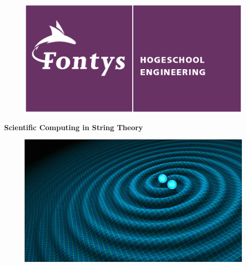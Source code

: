 \documentclass[../paper.tex]{subfiles}
\begin{document}
	\begin{titlepage}
	
		\begin{figure}[t]
		\begin{center} 
			\includegraphics[scale = 0.7]{fontys.png} %
			\label{default}
			
		\end{center}
	\end{figure}


		\begin{center}
			\Huge{\bfseries Scientific Computing in String Theory} %
		\end{center}



\begin{minipage}{0.75\linewidth}

    \begin{figure}[H]
        \centering
        \includegraphics[scale = 0.21]{frontimage.jpg}
    \end{figure}
  \end{minipage}
  
  \vfill
  

\end{titlepage}
\end{document}
